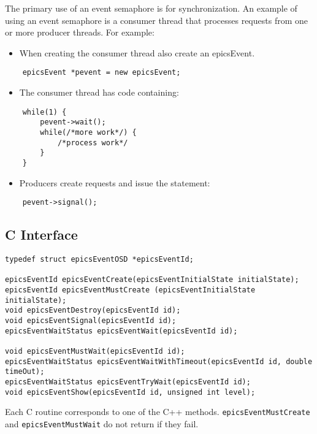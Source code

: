 The primary use of an event semaphore is for synchronization. An example of using an event semaphore is a consumer 
thread that processes requests from one or more producer threads. For example:

\begin{itemize}\item When creating the consumer thread also create an epicsEvent.

\end{itemize}\begin{verbatim}    epicsEvent *pevent = new epicsEvent;
\end{verbatim}\begin{itemize}\item The consumer thread has code containing:

\end{itemize}\begin{verbatim}    while(1) {
        pevent->wait();
        while(/*more work*/) {
            /*process work*/
        }
    }
\end{verbatim}\begin{itemize}\item Producers create requests and issue the statement:

\end{itemize}\begin{verbatim}    pevent->signal();
\end{verbatim}\subsection{C Interface}

\begin{verbatim}typedef struct epicsEventOSD *epicsEventId;

epicsEventId epicsEventCreate(epicsEventInitialState initialState);
epicsEventId epicsEventMustCreate (epicsEventInitialState initialState);
void epicsEventDestroy(epicsEventId id);
void epicsEventSignal(epicsEventId id);
epicsEventWaitStatus epicsEventWait(epicsEventId id);

void epicsEventMustWait(epicsEventId id);
epicsEventWaitStatus epicsEventWaitWithTimeout(epicsEventId id, double timeOut);
epicsEventWaitStatus epicsEventTryWait(epicsEventId id);
void epicsEventShow(epicsEventId id, unsigned int level);
\end{verbatim}
Each C routine corresponds to one of the C++ methods. \verb|epicsEventMustCreate| and \verb|epicsEventMustWait| do 
not return if they fail.

